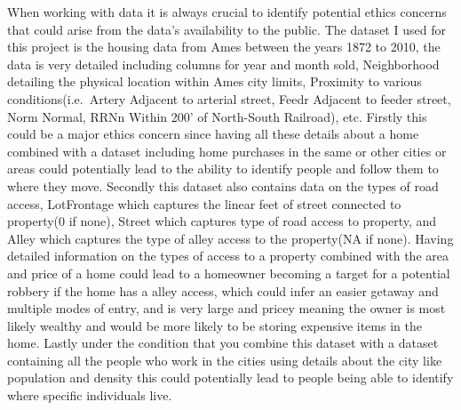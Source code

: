 \documentclass[
]{article}
\begin{document}
When working with data it is always crucial to identify potential ethics
concerns that could arise from the data's availability to the public.
The dataset I used for this project is the housing data from Ames
between the years 1872 to 2010, the data is very detailed including
columns for year and month sold, Neighborhood detailing the physical
location within Ames city limits, Proximity to various
conditions(i.e.~Artery Adjacent to arterial street, Feedr Adjacent to
feeder street, Norm Normal, RRNn Within 200' of North-South Railroad),
etc. Firstly this could be a major ethics concern since having all these
details about a home combined with a dataset including home purchases in
the same or other cities or areas could potentially lead to the ability
to identify people and follow them to where they move. Secondly this
dataset also contains data on the types of road access, LotFrontage
which captures the linear feet of street connected to property(0 if
none), Street which captures type of road access to property, and Alley
which captures the type of alley access to the property(NA if none).
Having detailed information on the types of access to a property
combined with the area and price of a home could lead to a homeowner
becoming a target for a potential robbery if the home has a alley
access, which could infer an easier getaway and multiple modes of entry,
and is very large and pricey meaning the owner is most likely wealthy
and would be more likely to be storing expensive items in the home.
Lastly under the condition that you combine this dataset with a dataset
containing all the people who work in the cities using details about the
city like population and density this could potentially lead to people
being able to identify where specific individuals live.
\end{document}

